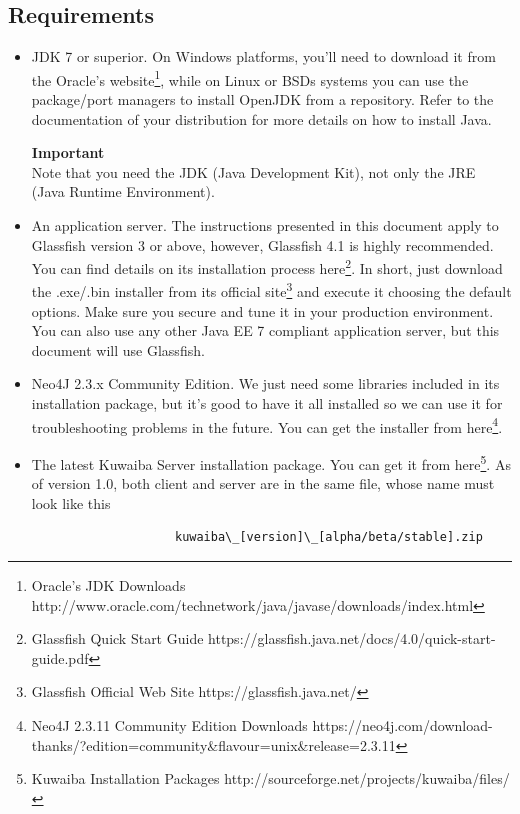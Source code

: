 \documentclass[a4paper]{article}
\begin{document}
		\subsection{Requirements}
			\begin{itemize}
				\item JDK 7 or superior. On Windows platforms, you'll need to download it from the Oracle's website\footnote{Oracle's JDK Downloads http://www.oracle.com/technetwork/java/javase/downloads/index.html}, while on Linux or BSDs systems you can use the package/port managers to install OpenJDK from a repository. Refer to the documentation of your distribution for more details on how to install Java.
				\begin{framed} {\large \textbf{Important}} \\
					Note that you need the JDK (Java Development Kit), not only the JRE (Java Runtime Environment).
				\end{framed}
				\item An application server. The instructions presented in this document apply to Glassfish version 3 or above, however, Glassfish 4.1 is highly recommended. You can find details on its installation process here\footnote{Glassfish Quick Start Guide https://glassfish.java.net/docs/4.0/quick-start-guide.pdf}. In short, just download the .exe/.bin installer from its official site\footnote{Glassfish Official Web Site https://glassfish.java.net/} and execute it choosing the default options. Make sure you secure and tune it in your production environment. You can also use any other Java EE 7 compliant application server, but this document will use Glassfish.
				\item Neo4J 2.3.x Community Edition. We just need some libraries included in its installation package, but it's good to have it all installed so we can use it for troubleshooting problems in the future. You can get the installer from here\footnote {Neo4J 2.3.11 Community Edition Downloads https://neo4j.com/download-thanks/?edition=community\&flavour=unix\&release=2.3.11}.
				\item The latest Kuwaiba Server installation package. You can get it from here\footnote {Kuwaiba Installation Packages http://sourceforge.net/projects/kuwaiba/files/}. As of version 1.0, both client and server are in the same file, whose name must look like this 
		
				\begin{verbatim}
					kuwaiba\_[version]\_[alpha/beta/stable].zip
				\end{verbatim}
				
			\end{itemize}
		
\end{document}
